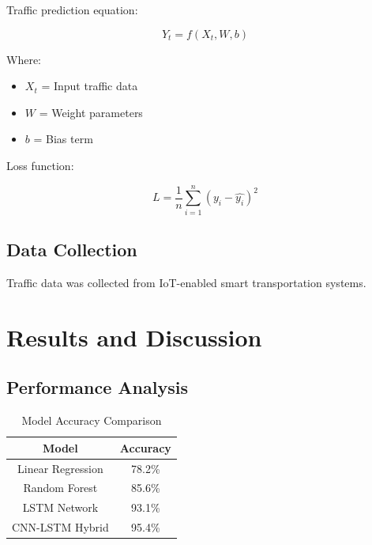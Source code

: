 \documentclass[12pt,a4paper]{report}
\begin{document}
	Traffic prediction equation:
	
	\[
	Y_t = f(X_t,W,b)
	\]
	
	Where:
	
	\begin{itemize}
		
		\item $X_t$ = Input traffic data
		
		\item $W$ = Weight parameters
		
		\item $b$ = Bias term
		
	\end{itemize}
	
	Loss function:
	
	\[
	L = \frac{1}{n}\sum_{i=1}^{n}(y_i - \hat{y_i})^2
	\]
	
	\section{Data Collection}
	
	Traffic data was collected from IoT-enabled smart transportation systems.
	
	
	\chapter{Results and Discussion}
	
	\section{Performance Analysis}
	
	\begin{table}[h]
		
		\centering
		
		\caption{Model Accuracy Comparison}
		
		\begin{tabular}{|c|c|}
			
			\hline
			
			Model & Accuracy \\
			
			\hline
			
			Linear Regression & 78.2\% \\
			
			\hline
			
			Random Forest & 85.6\% \\
			
			\hline
			
			LSTM Network & 93.1\% \\
			
			\hline
			
			CNN-LSTM Hybrid & 95.4\% \\
			
			\hline
			
		\end{tabular}
		
	\end{table}
	
\end{document}

